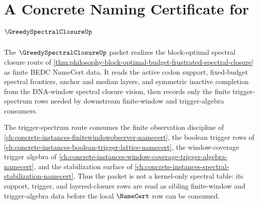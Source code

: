\chapter{A Concrete Naming Certificate for $\GreedySpectralClosureUp$}
\label{ch:concrete-instances-greedy-spectral-closure-namecert}

The $\GreedySpectralClosureUp$ packet realizes the block-optimal spectral closure route of \autoref{thm:philosophy-block-optimal-budget-frustrated-spectral-closure} as finite BEDC NameCert data. It reads the active codon support, fixed-budget spectral frontiers, anchor and median layers, and symmetric inactive completion from the DNA-window spectral closure vision, then records only the finite trigger-spectrum rows needed by downstream finite-window and trigger-algebra consumers.

The trigger-spectrum route consumes the finite observation discipline of \autoref{ch:concrete-instances-finitewindowobserver-namecert}, the boolean trigger rows of \autoref{ch:concrete-instances-boolean-trigger-lattice-namecert}, the window-coverage trigger algebra of \autoref{ch:concrete-instances-window-coverage-trigger-algebra-namecert}, and the stabilization surface of \autoref{ch:concrete-instances-spectral-stabilization-namecert}. Thus the packet is not a kernel-only spectral table: its support, trigger, and layered-closure rows are read as sibling finite-window and trigger-algebra data before the local $\NameCert$ row can be consumed.

